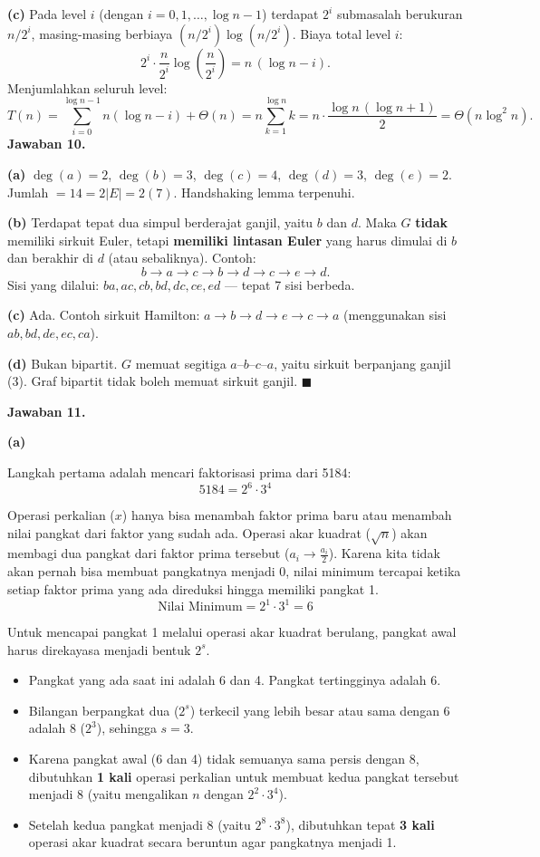 \documentclass[11pt,a4paper]{article}
\newcommand{\jawab}[1]{\vspace{4pt}\noindent\textbf{Jawaban #1.}\par\nobreak\vspace{2pt}}
\DeclareMathOperator{\Deg}{deg}
\begin{document}
\textbf{(c)} Pada level $i$ (dengan $i = 0,1,\dots,\log n - 1$) terdapat $2^{i}$
submasalah berukuran $n/2^{i}$, masing-masing berbiaya
$(n/2^{i})\log(n/2^{i})$. Biaya total level $i$:
\[
2^{i} \cdot \frac{n}{2^{i}} \log\!\left(\frac{n}{2^{i}}\right)
= n\,(\log n - i).
\]
Menjumlahkan seluruh level:
\[
T(n) = \sum_{i=0}^{\log n - 1} n(\log n - i) + \Theta(n)
     = n \sum_{k=1}^{\log n} k
     = n \cdot \frac{\log n\,(\log n + 1)}{2}
     = \Theta\!\left(n \log^{2} n\right).
\]
\jawab{10}
\textbf{(a)} $\Deg(a)=2$, $\Deg(b)=3$, $\Deg(c)=4$, $\Deg(d)=3$, $\Deg(e)=2$.
Jumlah $= 14 = 2|E| = 2(7)$. Handshaking lemma terpenuhi.

\textbf{(b)} Terdapat tepat dua simpul berderajat ganjil, yaitu $b$ dan $d$.
Maka $G$ \textbf{tidak} memiliki sirkuit Euler, tetapi \textbf{memiliki lintasan Euler}
yang harus dimulai di $b$ dan berakhir di $d$ (atau sebaliknya). Contoh:
\[
b \to a \to c \to b \to d \to c \to e \to d .
\]
Sisi yang dilalui: $ba, ac, cb, bd, dc, ce, ed$ --- tepat 7 sisi berbeda.

\textbf{(c)} Ada. Contoh sirkuit Hamilton: $a \to b \to d \to e \to c \to a$
(menggunakan sisi $ab, bd, de, ec, ca$).

\textbf{(d)} Bukan bipartit. $G$ memuat segitiga $a$--$b$--$c$--$a$, yaitu sirkuit
berpanjang ganjil (3). Graf bipartit tidak boleh memuat sirkuit ganjil. $\blacksquare$

\jawab{11}
\textbf{(a)}

Langkah pertama adalah mencari faktorisasi prima dari 5184:
$$5184 = 2^6 \cdot 3^4$$


Operasi perkalian ($x$) hanya bisa menambah faktor prima baru atau menambah nilai pangkat dari faktor yang sudah ada. Operasi akar kuadrat ($\sqrt{n}$) akan membagi dua pangkat dari faktor prima tersebut ($a_i \to \frac{a_i}{2}$). Karena kita tidak akan pernah bisa membuat pangkatnya menjadi 0, nilai minimum tercapai ketika setiap faktor prima yang ada direduksi hingga memiliki pangkat 1.
$$\text{Nilai Minimum} = 2^1 \cdot 3^1 = 6$$

Untuk mencapai pangkat 1 melalui operasi akar kuadrat berulang, pangkat awal harus direkayasa menjadi bentuk $2^s$. 
\begin{itemize}
    \item Pangkat yang ada saat ini adalah 6 dan 4. Pangkat tertingginya adalah 6.
    \item Bilangan berpangkat dua ($2^s$) terkecil yang lebih besar atau sama dengan 6 adalah 8 ($2^3$), sehingga $s = 3$.
    \item Karena pangkat awal (6 dan 4) tidak semuanya sama persis dengan 8, dibutuhkan \textbf{1 kali} operasi perkalian untuk membuat kedua pangkat tersebut menjadi 8 (yaitu mengalikan $n$ dengan $2^2 \cdot 3^4$).
    \item Setelah kedua pangkat menjadi 8 (yaitu $2^8 \cdot 3^8$), dibutuhkan tepat \textbf{3 kali} operasi akar kuadrat secara beruntun agar pangkatnya menjadi 1.
\end{itemize}
\end{document}
